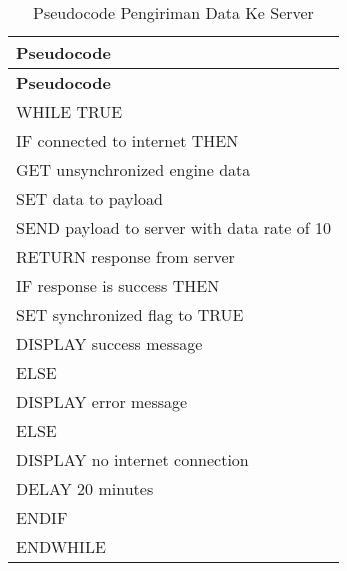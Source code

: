 \begin{longtable}[!h]
  {
          p{}
  }
  \caption{Pseudocode Pengiriman Data Ke Server}
  \label{tab:pseudocode-save-to-server} \\

  \hline
      \bfseries Pseudocode \\ [0.5ex]
  \hline

  \endfirsthead

  \hline
      \bfseries Pseudocode \\ [0.5ex]
  \hline
  \endhead %

  WHILE TRUE \\
  \hspace{5mm} IF connected to internet THEN \\
  \hspace{10mm} GET unsynchronized engine data \\
  \hspace{10mm} SET data to payload \\
  \hspace{10mm} SEND payload to server with data rate of 10 \\
  \hspace{10mm} RETURN response from server \\
  \hspace{15mm} IF response is success THEN \\
  \hspace{20mm} SET synchronized flag to TRUE \\
  \hspace{20mm} DISPLAY success message \\
  \hspace{15mm} ELSE \\
  \hspace{20mm} DISPLAY error message \\
  \hspace{5mm} ELSE \\
  \hspace{10mm} DISPLAY no internet connection \\
  \hspace{5mm} DELAY 20 minutes \\
  \hspace{5mm} ENDIF \\
  ENDWHILE \\

  \bottomrule
\end{longtable}